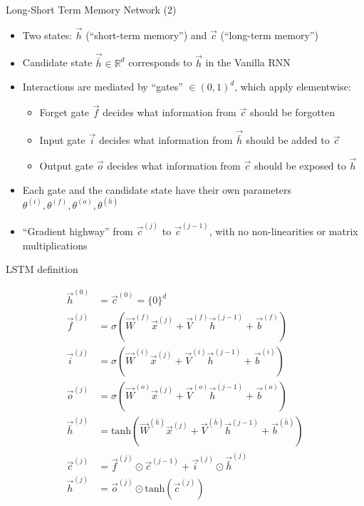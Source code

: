 \begin{vbframe}{Long-Short Term Memory Network (2)}

\vfill

\begin{itemize}
	\item Two states: $\vec h$ (``short-term memory'') and $\vec c$ (``long-term memory'')
	\item Candidate state $\vec{\bar{h}} \in \mathbb{R}^d$ corresponds to $\vec h$ in the Vanilla RNN
	\item Interactions are mediated by ``gates'' $\in (0, 1)^d$, which apply elementwise:
		\begin{itemize}
			\item Forget gate $\vec f$ decides what information from $\vec c$ should be forgotten
			\item Input gate $\vec i$ decides what information from $\vec {\bar{h}}$ should be added to $\vec c$
			\item Output gate $\vec o$ decides what information from $\vec c$ should be exposed to $\vec h$
		\end{itemize}
	\item Each gate and the candidate state have their own parameters $\theta^{(i)}, \theta^{(f)}, \theta^{(o)}, \theta^{(\bar{h})}$
	\item ``Gradient highway'' from $\vec c^{(j)}$ to $\vec c^{(j-1)}$, with no non-linearities or matrix multiplications
\end{itemize}

\vfill

\end{vbframe}


\begin{vbframe}{LSTM definition}

\vskip-1mm

\vfill

$$
\begin{aligned}
\vec h^{(0)} & = \vec c^{(0)} = \{0\}^d \\
\vec f^{(j)} & = \sigma(\vec W^{(f)} \vec x^{(j)} + \vec V^{(f)} \vec h^{(j-1)} + \vec b^{(f)}) \\
\vec i^{(j)} & = \sigma(\vec W^{(i)} \vec x^{(j)} + \vec V^{(i)} \vec h^{(j-1)} + \vec b^{(i)}) \\
\vec o^{(j)} & = \sigma(\vec W^{(o)} \vec x^{(j)} + \vec V^{(o)} \vec h^{(j-1)} + \vec b^{(o)}) \\
\vec {\bar{h}}^{(j)} & = \mathrm{tanh}(\vec W^{(\bar{h})} \vec x^{(j)} + \vec V^{(\bar{h})} \vec h^{(j-1)} + \vec b^{(\bar{h})}) \\
\vec c^{(j)} & = \vec f^{(j)} \odot \vec c^{(j-1)} + \vec i^{(j)} \odot \vec {\bar{h}}^{(j)} \\
\vec h^{(j)} &= \vec o^{(j)} \odot \mathrm{tanh}(\vec c^{(j)})
\end{aligned}
$$

\vfill

\end{vbframe}

